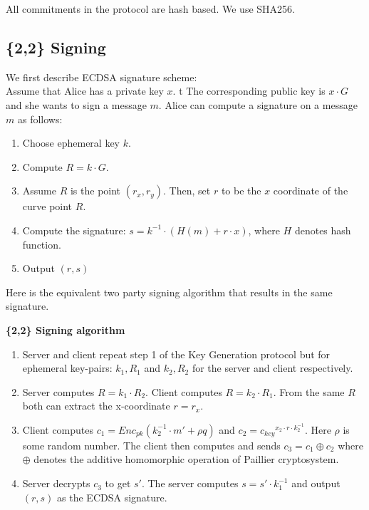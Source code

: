 \documentclass[runningheads]{llncs}
\begin{document}
All commitments in the protocol are hash based. We use SHA256. 
\subsection{\{2,2\} Signing} 
We first describe ECDSA signature scheme: \\
 Assume that Alice has a private key ${x}$. t
 The corresponding public key is ${x \cdot G}$ and she wants to sign a message ${m}$. Alice can compute a signature on a message ${m}$ as follows: 
 \begin{enumerate}
 \item Choose ephemeral key ${k}$.
 \item Compute ${R = k \cdot G}$.
 \item Assume ${R}$ is the point ${(r_x, r_y)}$. Then, set ${r}$ to be the ${x}$ coordinate of the curve point ${R}$.
 \item Compute the signature: ${s = k^{-1} \cdot (H(m)+ r\cdot x)}$, where ${H}$ denotes hash function.
 \item Output ${(r,s)}$
 \end{enumerate}
Here is the equivalent two party signing algorithm that results in the same signature. 
\begin{mdframed}[userdefinedwidth = 12.3cm]
\textbf{\{2,2\} Signing algorithm}
\begin{enumerate}

\item Server and client repeat step 1 of the Key Generation protocol but for ephemeral key-pairs: ${k_1,R_1}$ and ${k_2,R_2}$ for the server and client respectively. 
\item Server computes ${R =k_1 \cdot R_2}$. Client computes ${R = k_2 \cdot R_1}$. From the same ${R}$ both can extract the x-coordinate ${r=r_x}$.
\item Client computes ${c_1=Enc_{pk}(k_2^{-1}\cdot m' + \rho q)}$ and ${c_2={c_{key}}^{x_2\cdot r \cdot k_2^{-1}}}$. Here ${\rho}$ is some random number. The client then computes and sends ${c_3 = c_1 \oplus c_2}$ where ${\oplus}$ denotes the additive homomorphic operation of Paillier cryptosystem. 
\item Server decrypts ${c_3}$ to get ${s'}$. The server computes ${s=s'\cdot k_1^{-1}}$ and output ${(r,s)}$ as the ECDSA signature.
\end{enumerate}
\end{mdframed}
\end{document}
